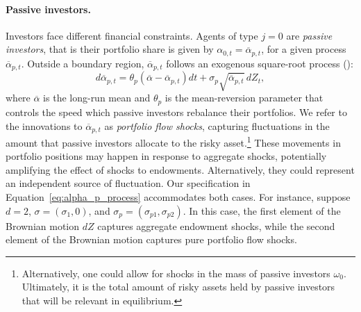 \paragraph{Passive investors.} Investors face different financial constraints. Agents of type $j = 0 $ are \textit{passive investors}, that is their portfolio share is given by $\alpha_{0,t} = \overline{\alpha}_{p,t}$, for a given process $\overline{\alpha}_{p,t}$. 
Outside a boundary region, $\overline{\alpha}_{p,t}$ follows an exogenous square-root process (\citealp{CIR/1985}):
\begin{equation}\label{eq:alpha_p_process}
    d \overline{\alpha}_{p,t} = \theta_p (\overline{\alpha} - \overline{\alpha}_{p,t}) dt + \sigma_{p} \sqrt{\overline{\alpha}_{p,t}}\, d Z_t,
\end{equation}
where $\overline{\alpha}$ is the long-run mean and $\theta_p$ is the mean-reversion parameter that controls the speed which passive investors rebalance their portfolios. 
We refer to the innovations to $\overline{\alpha}_{p,t}$ as \textit{portfolio flow shocks}, capturing fluctuations in the amount that passive investors allocate to the risky asset.\footnote{Alternatively, one could allow for shocks in the mass of passive investors $\omega_0$. Ultimately, it is the total amount of risky assets held by passive investors that will be relevant in equilibrium.}
These movements in portfolio positions may happen in response to aggregate shocks, potentially amplifying the effect of shocks to endowments. Alternatively, they could represent an independent source of fluctuation. 
Our specification in Equation~\eqref{eq:alpha_p_process} accommodates both cases. 
For instance, suppose $d=2$, $\sigma=\left(\sigma_1,0\right)$, and $\sigma_p=\left(\sigma_{p1},\sigma_{p2}\right)$.
In this case, the first element of the Brownian motion $dZ$ captures aggregate endowment shocks, while the second element of the Brownian motion captures pure portfolio flow shocks. 

